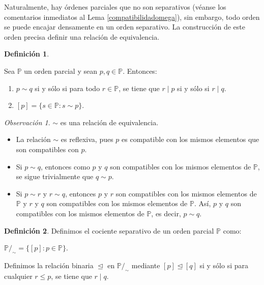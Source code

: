\documentclass[11pt]{unam_tesis1}
\theoremstyle{MyThmStyle}
\theoremstyle{definition}
\newtheorem{definition}{Definici\'on}[chapter]
\theoremstyle{plain}
\theoremstyle{remark}
\newtheorem*{remark}{Observaci\'on}
\let\leq\leqslant
\begin{document}
Naturalmente, hay \'ordenes parciales que no son separativos (v\'eanse los comentarios in\-me\-dia\-tos al Lema \ref{compatibilidadomega}), sin embargo, todo orden se puede encajar densamente en un orden separativo. La construcci\'on de este orden precisa definir una relaci\'on de equivalencia.

\begin{definition}\label{relacionseparativa}

Sea $\mathbb P$ un orden parcial y sean $p,q\in \mathbb P$. Entonces:

\begin{enumerate}

\item $p\sim q$ si y s\'olo si para todo $r\in \mathbb P$, se tiene que $r\mid p$ si y s\'olo si $r\mid q$.
\item $[p]=\{s\in \mathbb P:s\sim p \}$.

\end{enumerate}

\end{definition}

\begin{remark}
$\sim$ es una relaci\'on de equivalencia.
\end{remark}

\begin{itemize}
\item La relaci\'on $\sim$ es reflexiva, pues $p$ es compatible con los mismos elementos que son compatibles con $p$.
\item Si $p\sim q$, entonces como $p$ y $q$ son compatibles con los mismos elementos de $\mathbb P$, se sigue trivialmente que $q\sim p$.
\item Si $p\sim r$ y $r\sim q$, entonces $p$ y $r$ son compatibles con los mismos elementos de $\mathbb P$ y $r$ y $q$ son compatibles con los mismos elementos de $\mathbb P$. As\'i, $p$ y $q$ son compatibles con los mismos elementos de $\mathbb P$, es decir, $p\sim q$.
\end{itemize}
\newpage

\begin{definition}\label{ordenseparativo}
Definimos el cociente separativo de un orden parcial $\mathbb P$ como:

\begin{center}
$\mathbb P/_\sim =\{[p]:p\in \mathbb P\}$.
\end{center}

Definimos la relaci\'on binaria $\trianglelefteq$ en $\mathbb P/_\sim$ mediante $[p]\trianglelefteq [q]$ si y s\'olo si para cualquier $r\leq p$, se tiene que $r\mid q$.
\end{definition}
\end{document}
